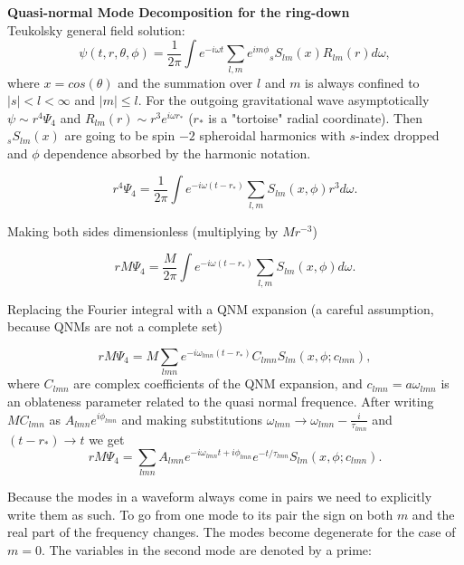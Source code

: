 \documentclass[11pt]{article}
\begin{document}
\noindent
{\large\bf Quasi-normal Mode Decomposition for the ring-down} \\

Teukolsky general field solution:
\begin{equation}
\psi(t,r,\theta,\phi) = \frac{1}{2\pi} \int {e^{-i\omega t} \sum_{l,m} e^{im\phi} {}_sS_{lm}(x)R_{lm}(r) d\omega },
\end{equation}
where $x=cos(\theta)$ and the summation over $l$ and $m$ is always confined to $|s|< l < \infty$ and $|m| \leq l$. For the outgoing gravitational wave asymptotically $\psi \sim r^4\Psi_4$ and $R_{lm}(r) \sim r^3e^{i\omega r_*}$ ($r_*$ is a "tortoise" radial coordinate). Then ${}_sS_{lm}(x)$ are going to be spin $-2$ spheroidal harmonics with $s$-index dropped and $\phi$ dependence absorbed by the harmonic notation.

\begin{equation}
r^4\Psi_4 = \frac{1}{2\pi} \int {e^{-i\omega (t-r_*)} \sum_{l,m} S_{lm}(x,\phi) r^3 d\omega }.
\end{equation}

\noindent
Making both sides dimensionless (multiplying by $Mr^{-3}$)

\begin{equation}
rM\Psi_4 = \frac{M}{2\pi} \int {e^{-i\omega (t-r_*)} \sum_{l,m} S_{lm}(x,\phi) d\omega }.
\end{equation}

\noindent
Replacing the Fourier integral with a QNM expansion (a careful assumption, because QNMs are not a complete set)

\begin{equation}
rM\Psi_4 = M \sum_{lmn}e^{-i\omega_{lmn} (t-r_*)} C_{lmn} S_{lm}(x,\phi ; c_{lmn}), 
\end{equation}
where $C_{lmn}$ are complex coefficients of the QNM expansion, and $c_{lmn}=a\omega_{lmn}$ is an oblateness parameter related to the quasi normal frequence. After writing $MC_{lmn}$ as $A_{lmn}e^{i\phi_{lmn}}$ and making substitutions $\omega_{lmn} \rightarrow  \omega_{lmn} - \frac{i}{\tau_{lmn}}$ and $(t-r_*) \rightarrow t$ we get
\begin{equation}
rM\Psi_4 = \sum_{lmn} A_{lmn} e^{-i\omega_{lmn}t+i\phi_{lmn}}e^{-t/\tau_{lmn}} S_{lm}(x,\phi ; c_{lmn}).
\end{equation}

\noindent
Because the modes in a waveform always come in pairs we need to explicitly write them as such. To go from one mode to its pair the sign on both $m$ and the real part of the frequency changes. The modes become degenerate for the case of $m=0$. The variables in the second mode are denoted by a prime:
\end{document}

